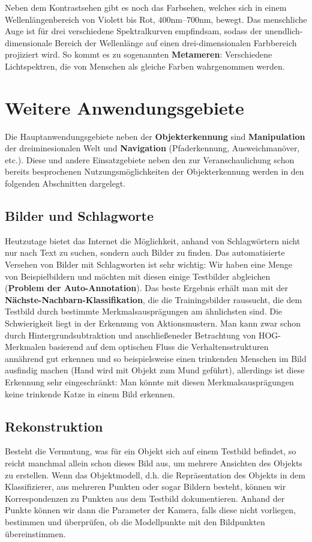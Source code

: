 Neben dem Kontrastsehen gibt es noch das Farbsehen, welches sich in einem Wellenlängenbereich von Violett bis Rot, $400$nm--$700$nm, bewegt. Das menschliche Auge ist für drei verschiedene Spektralkurven empfindsam, sodass der unendlich-dimensionale Bereich der Wellenlänge auf einen drei-dimensionalen Farbbereich projiziert wird. So kommt es zu sogenannten \textbf{Metameren}: Verschiedene Lichtspektren, die von Menschen als gleiche Farben wahrgenommen werden.

\section{Weitere Anwendungsgebiete}
Die Hauptanwendungsgebiete neben der \textbf{Objekterkennung} sind \textbf{Manipulation} der dreiminesionalen Welt und \textbf{Navigation} (Pfaderkennung, Ausweichmanöver, etc.). Diese und andere Einsatzgebiete neben den zur Veranschaulichung schon bereits besprochenen Nutzungsmöglichkeiten der Objekterkennung werden in den folgenden Abschnitten dargelegt.


\subsection{Bilder und Schlagworte}
Heutzutage bietet das Internet die Möglichkeit, anhand von Schlagwörtern nicht nur nach Text zu suchen, sondern auch Bilder zu finden. Das automatisierte Versehen von Bilder mit Schlagworten ist sehr wichtig: Wir haben eine Menge von Beispielbildern und möchten mit diesen einige Testbilder abgleichen (\textbf{Problem der Auto-Annotation}). Das beste Ergebnis erhält man mit der \textbf{Nächste-Nachbarn-Klassifikation}, die die Trainingsbilder raussucht, die dem Testbild durch bestimmte Merkmalsausprägungen am ähnlichsten sind. Die Schwierigkeit liegt in der Erkennung von Aktionsmustern. Man kann zwar schon durch Hintergrundsubtraktion und anschließeneder Betrachtung von HOG-Merkmalen basierend auf dem optischen Fluss die Verhaltensstrukturen annährend gut erkennen und so beispielsweise einen trinkenden Menschen im Bild ausfindig machen (Hand wird mit Objekt zum Mund geführt), allerdings ist diese Erkennung sehr eingeschränkt: Man könnte mit diesen Merkmalsausprägungen keine trinkende Katze in einem Bild erkennen.


\subsection{Rekonstruktion}
Besteht die Vermutung, was für ein Objekt sich auf einem Testbild befindet, so reicht manchmal allein schon dieses Bild aus, um mehrere Ansichten des Objekts zu erstellen. Wenn das Objektmodell, d.h. die Repräsentation des Objekts in dem Klassifizierer, aus mehreren Punkten oder sogar Bildern besteht, können wir Korrespondenzen zu Punkten aus dem Testbild dokumentieren. Anhand der Punkte können wir dann die Parameter der Kamera, falls diese nicht vorliegen, bestimmen und überprüfen, ob die Modellpunkte mit den Bildpunkten übereinstimmen.

